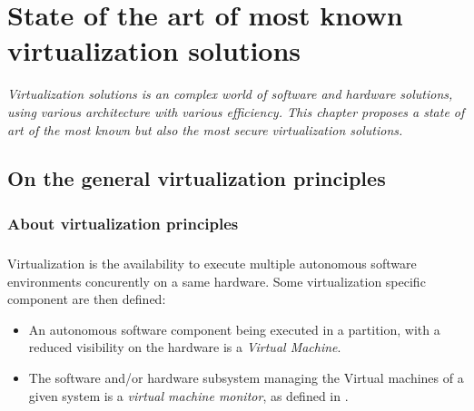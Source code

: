 
\chapter{State of the art of most known virtualization solutions}

{\it
Virtualization solutions is an complex world of software and hardware solutions, using various
architecture with various efficiency. This chapter proposes a state of art of the most known but
also the most secure virtualization solutions.
}

\doMinitoc

\section{On the general virtualization principles}

\subsection{About virtualization principles}

\paragraph{}
Virtualization is the availability to execute multiple autonomous software environments
concurently on a same hardware. Some virtualization specific component are then defined:
\begin{itemize}
\item An autonomous software component being executed in a partition, with a reduced visibility on
the hardware is a {\it Virtual Machine}.
\item The software and/or hardware subsystem managing the Virtual machines of a given system is a
{\it virtual machine monitor}, as defined in \cite{popek}.
\end{itemize}

